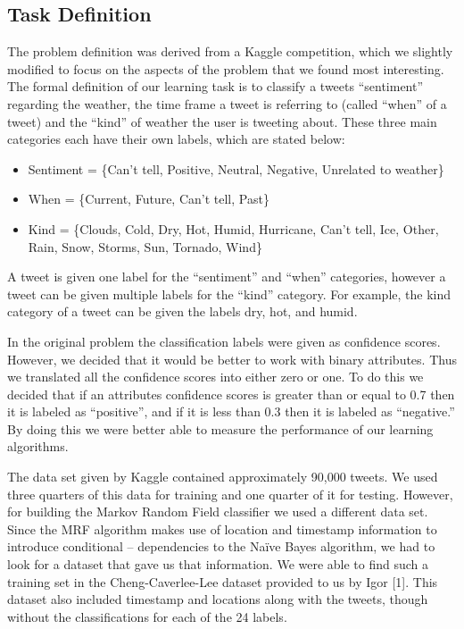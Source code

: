 \subsection{Task Definition}
	The problem definition was derived from a Kaggle competition, which we slightly modified to focus on the aspects of the problem that we found most interesting. The formal definition of our learning task is to classify a tweets “sentiment” regarding the weather, the time frame a tweet is referring to (called “when” of a tweet) and the “kind” of weather the user is tweeting about. These three main categories each have their own labels, which are stated below:     
 
\begin{itemize}
\item Sentiment = \{Can’t tell, Positive, Neutral, Negative, Unrelated to weather\}
\item When = \{Current, Future, Can’t tell, Past\}
\item Kind = \{Clouds, Cold, Dry, Hot, Humid, Hurricane, Can’t tell, Ice, Other, Rain, Snow, Storms, Sun, Tornado, Wind\}
\end{itemize}
 
	A tweet is given one label for the “sentiment” and “when” categories, however a tweet can be given multiple labels for the “kind” category. For example, the kind category of a tweet can be given the labels dry, hot, and humid.

	In the original problem the classification labels were given as confidence scores. However, we decided that it would be better to work with binary attributes. Thus we translated all the confidence scores into either zero or one. To do this we decided that if an attributes confidence scores is greater than or equal to 0.7 then it is labeled as “positive”, and if it is less than 0.3 then it is labeled as “negative.” By doing this we were better able to measure the performance of our learning algorithms.

	The data set given by Kaggle contained approximately 90,000 tweets. We used three quarters of this data for training and one quarter of it for testing. However, for building the Markov Random Field classifier we used a different data set. Since the MRF algorithm makes use of location and timestamp information to introduce conditional – dependencies to the Naïve Bayes algorithm, we had to look for a dataset that gave us that information. We were able to find such a training set in the Cheng-Caverlee-Lee dataset provided to us by Igor [1]. This dataset also included timestamp and locations along with the tweets, though without the classifications for each of the 24 labels.

